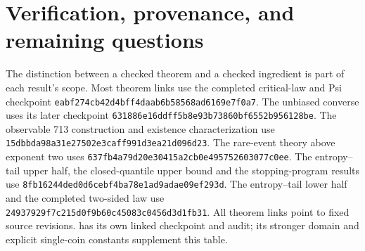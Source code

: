 \section{Verification, provenance, and remaining questions}\label{sec:verification}
The distinction between a checked theorem and a checked ingredient is
part of each result's scope. Most theorem links use the completed critical-law
and Psi checkpoint \nolinkurl{eabf274cb42d4bff4daab6b58568ad6169e7f0a7}.
The unbiased converse uses its later checkpoint
\nolinkurl{631886e16ddff5b8e93b73860bf6552b956128be}.
The observable 713 construction and existence characterization use
\nolinkurl{15dbbda98a31e27502e3caff991d3ea21d096d23}.
The rare-event theory above exponent two uses
\nolinkurl{637fb4a79d20e30415a2cb0e495752603077c0ee}.
The entropy--tail upper half, the closed-quantile upper bound and the
stopping-program results use \nolinkurl{8fb16244ded0d6cebf4ba78e1ad9adae09ef293d}.
The entropy--tail lower half and the completed two-sided law use
\nolinkurl{24937929f7c215d0f9b60c45083c0456d3d1fb31}.
All theorem links point to fixed source revisions.
 has its own linked checkpoint and audit;
its stronger domain and explicit single-coin constants supplement this table.

